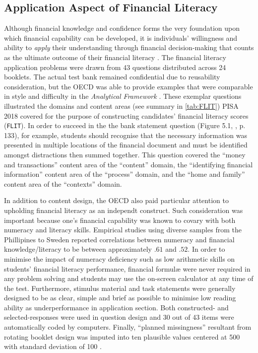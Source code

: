 \documentclass[a4paper,11pt,UKenglish,twoside,openright]{report}\usepackage[]{graphicx}\usepackage[]{color}
\begin{document}
\subsection{Application Aspect of Financial Literacy}



Although financial knowledge and confidence forms the very foundation upon which financial capability can be developed, it is individuals' willingness and ability to \emph{apply} their understanding through financial decision-making that counts as the ultimate outcome of their financial literacy \parencite{huston:2010}. The financial literacy application problems were drawn from 43 questions distributed across 24 booklets. The actual test bank remained confidential due to reusability consideration, but the OECD was able to provide examples that were comparable in style and difficulty in the \textit{Analytical Framework} \parencite[][pp. 133--148]{PISAframework}. These exemplar questions illustrated the domains and content areas (see summary in \cref{tab:FLIT}) PISA 2018 covered for the purpose of constructing candidates' financial literacy scores (\texttt{FLIT}). In order to succeed in the the bank statement question (Figure 5.1, \textcite{PISAframework}, p. 133), for example, students should recognise that the necessary information was presented in multiple locations of the financial document and must be identified amongst distractions then summed together. This question covered the ``money and transactions'' content area of the ``content'' domain, the ``identifying financial information'' content area of the ``process'' domain, and the ``home and family'' content area of the ``contexts'' domain.

In addition to content design, the OECD also paid particular attention to upholding financial literacy as an independt construct. Such consideration was important because one's financial capability was known to covary with both numeracy \parencite{geiger:2020, ozkale:2020a, ozkale:2020b, sole:2014} and literacy \parencite{bay:2014} skills. Empirical studies using diverse samples from the Phillipines \parencite{indefenso:2020} to Sweden \parencite{skagerlund:2018} reported correlations between numeracy and financial knowledge/literacy to be between approximately $.61$ and $.52$. In order to minimise the impact of numeracy deficiency such as low arithmetic skills \parencite{huston:2010} on students' financial literacy performance, financial formul{\ae} were never required in any problem solving and students may use the on-screen calculator at any time of the test. Furthermore, stimulus material and task statements were generally designed to be as clear, simple and brief as possible to minimise low reading ability as underperformance in application section. Both constructed- and selected-responses were used in question design and 30 out of 43 items were automatically coded by computers. Finally, ``planned missingness'' resultant from rotating booklet design was imputed into ten plausible values \parencite{vondavier:2014} centered at 500 with standard deviation of 100 \parencite{PISAframework}.
\end{document}
